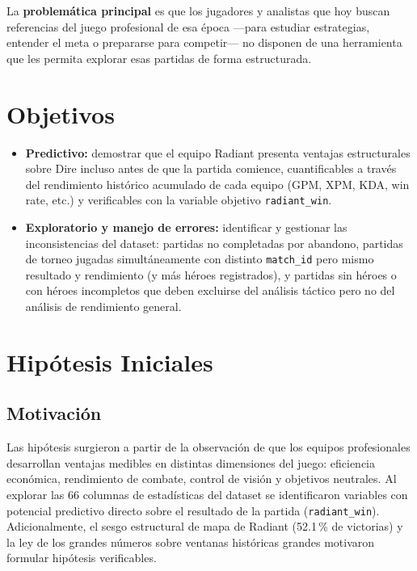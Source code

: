 \documentclass[12pt,a4paper]{article}
\begin{document}
La \textbf{problem\'atica principal} es que los jugadores y analistas que hoy
buscan referencias del juego profesional de esa \'epoca ---para estudiar estrategias,
entender el meta o prepararse para competir--- no disponen de una herramienta
que les permita explorar esas partidas de forma estructurada.

\section{Objetivos}

\begin{itemize}
  \item \textbf{Predictivo:} demostrar que el equipo Radiant presenta ventajas
        estructurales sobre Dire incluso antes de que la partida comience,
        cuantificables a trav\'es del rendimiento hist\'orico acumulado de cada
        equipo (GPM, XPM, KDA, win rate, etc.) y verificables con la variable
        objetivo \texttt{radiant\_win}.
  \item \textbf{Exploratorio y manejo de errores:} identificar y gestionar
        las inconsistencias del dataset: partidas no completadas por abandono,
        partidas de torneo jugadas simult\'aneamente con distinto \texttt{match\_id}
        pero mismo resultado y rendimiento (y m\'as h\'eroes registrados), y
        partidas sin h\'eroes o con h\'eroes incompletos que deben excluirse del
        an\'alisis t\'actico pero no del an\'alisis de rendimiento general.
\end{itemize}

\section{Hip\'otesis Iniciales}

\subsection{Motivaci\'on}

Las hip\'otesis surgieron a partir de la observaci\'on de que los equipos
profesionales desarrollan ventajas medibles en distintas dimensiones del juego:
eficiencia econ\'omica, rendimiento de combate, control de visi\'on y objetivos
neutrales. Al explorar las 66 columnas de estad\'isticas del dataset se
identificaron variables con potencial predictivo directo sobre el resultado de la
partida (\texttt{radiant\_win}). Adicionalmente, el sesgo estructural de mapa de
Radiant (52.1\,\% de victorias) y la ley de los grandes n\'umeros sobre ventanas
hist\'oricas grandes motivaron formular hip\'otesis verificables.
\end{document}
